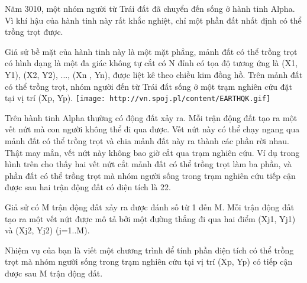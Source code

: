 Năm 3010, một nhóm người từ Trái đất đã chuyển đến sống ở hành tinh Alpha. Vì khí hậu của hành tinh này rất khắc nghiệt, chỉ một phần đất nhất định có thể trồng trọt được.  

   Giả sử bề mặt của hành tinh này là một mặt phẳng, mảnh đất có thể trồng trọt có hình dạng là một đa giác không tự cắt có N đỉnh có tọa độ tương ứng là (X1, Y1), (X2, Y2), ..., (Xn , Yn), được liệt kê theo chiều kim đồng hồ. Trên mảnh đất có thể trồng trọt, nhóm người đến từ Trái đất sống ở một trạm nghiên cứu đặt tại vị trí (Xp, Yp).  
\texttt{[image: http://vn.spoj.pl/content/EARTHQK.gif]}

   Trên hành tinh Alpha thường có động đất xảy ra. Mỗi trận động đất tạo ra một vết nứt mà con người không thể đi qua được. Vết nứt này có thể chạy ngang qua mảnh đất có thể trồng trọt và chia mảnh đất này ra thành các phần rời nhau. Thật may mắn, vết nứt này không bao giờ cắt qua trạm nghiên cứu. Ví dụ trong hình trên cho thấy hai vết nứt cắt mảnh đất có thể trồng trọt làm ba phần, và phần đất có thể trồng trọt mà nhóm người sống trong trạm nghiên cứu tiếp cận được sau hai trận động đất có diện tích là 22.  

   Giả sử có M trận động đất xảy ra được đánh số từ 1 đến M. Mỗi trận động đất tạo ra một vết nứt được mô tả bởi một đường thẳng đi qua hai điểm (Xj1, Yj1) và (Xj2, Yj2) (j=1..M).  

   Nhiệm vụ của bạn là viết một chương trình để tính phần diện tích có thể trồng trọt mà nhóm người sống trong trạm nghiên cứu tại vị trí (Xp, Yp) có tiếp cận được sau M trận động đất.